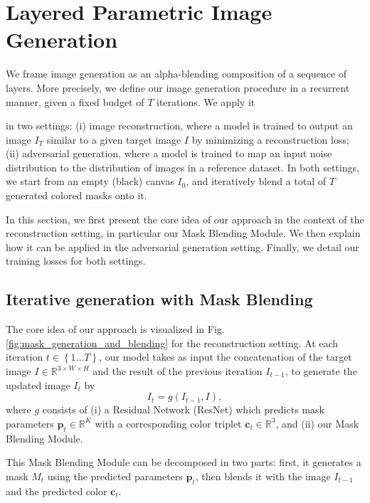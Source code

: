 \documentclass[10pt,twocolumn,letterpaper]{article}
\begin{document}
\section{Layered Parametric Image Generation}

We frame image generation as an alpha-blending composition of a sequence of layers.
More precisely, we define our image generation procedure in a recurrent manner, given a fixed budget of $T$ iterations. We apply it  

in two settings: (i) image reconstruction, where a model is trained to output an image $I_{T}$ similar to a given target image $I$ by minimizing a reconstruction loss; (ii) adversarial generation, where a model is trained to map an input noise distribution to the distribution of images in a reference dataset. In both settings, we start from an empty (black) canvas $I_0$, and iteratively blend a total of $T$ generated colored masks onto it.

In this section, we first present the core idea of our approach in the context of the reconstruction setting, in particular our Mask Blending Module.
We then explain how it can be applied in the adversarial generation setting.
Finally, we detail our training losses for both settings. 

\subsection{Iterative generation with Mask Blending}

The core idea of our approach is visualized in Fig. \ref{fig:mask_generation_and_blending} for the reconstruction setting. At each iteration $t\in \left\lbrace 1...T\right\rbrace$, our model takes as input the concatenation of the target image $I \in \mathbb{R}^{3\times W\times H}$ and the result of the previous iteration $I_{t-1}$, to generate the updated image $I_t$ by
\begin{equation}
I_t = g(I_{t-1}, I),
\label{eq:aeset}
\end{equation} where $g$ consists of (i) 
a Residual Network (ResNet) which predicts mask parameters $\mathbf{p}_t\in \mathbb{R}^K$ with a corresponding color triplet $\mathbf{c}_t\in \mathbb{R}^3$, and (ii) our Mask Blending Module. 

This Mask Blending Module can be decomposed in two parts: first, it generates a mask $M_t$ using the predicted parameters $\mathbf{p}_t$, then blends it with the image $I_{t-1}$ and the predicted color $\mathbf{c}_t$.
\end{document}
